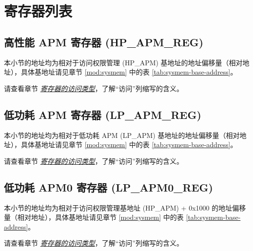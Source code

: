 \documentclass[main\_\_CN.tex]{subfiles}
\begin{document}




\hypertarget{permctrl-reg-summ}{}
\section{寄存器列表}
\label{sec:permctrl-reg-summ}

\subsection{高性能 APM 寄存器 (HP\_APM\_REG)}
\label{sec:permctrl-reg-hp}

本小节的地址均为相对于访问权限管理 (HP\_APM) 基地址的地址偏移量（相对地址），具体基地址请见章节 \ref{mod:sysmem} \textit{} 中的表 \ref{tab:sysmem-base-address}。

请查看章节 \hyperref[glossary-access-types]{\textit{寄存器的访问类型}}，了解“访问”列缩写的含义。



\subsection{低功耗 APM 寄存器 (LP\_APM\_REG)}
\label{sec:permctrl-reg-lp}

本小节的地址均为相对于低功耗 APM (LP\_APM) 基地址的地址偏移量（相对地址），具体基地址请见章节 \ref{mod:sysmem} \textit{} 中的表 \ref{tab:sysmem-base-address}。

请查看章节 \hyperref[glossary-access-types]{\textit{寄存器的访问类型}}，了解“访问”列缩写的含义。



\subsection{低功耗 APM0 寄存器 (LP\_APM0\_REG)}
\label{sec:permctrl-reg-lp0}

本小节的地址均为相对于访问权限管理基地址 (HP\_APM) + 0x1000 的地址偏移量（相对地址），具体基地址请见章节 \ref{mod:sysmem} \textit{} 中的表 \ref{tab:sysmem-base-address}。

请查看章节 \hyperref[glossary-access-types]{\textit{寄存器的访问类型}}，了解“访问”列缩写的含义。
\end{document}
